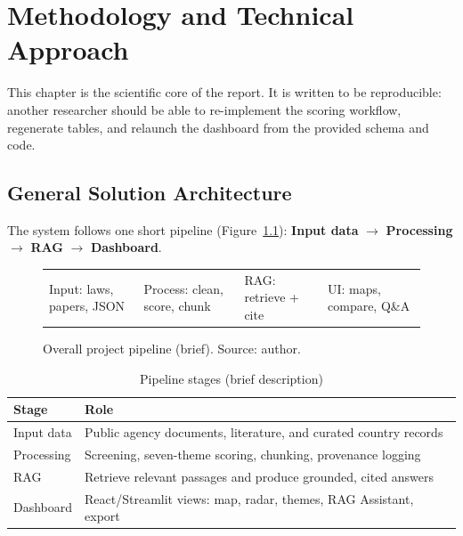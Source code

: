 \chapter{Methodology and Technical Approach}
\label{ch:method}

This chapter is the scientific core of the report. It is written to be reproducible: another researcher should be able to re-implement the scoring workflow, regenerate tables, and relaunch the dashboard from the provided schema and code.

\section{General Solution Architecture}
\label{sec:arch}

The system follows one short pipeline (Figure~\ref{fig:pipeline}):
\textbf{Input data} $\rightarrow$ \textbf{Processing} $\rightarrow$ \textbf{RAG}
$\rightarrow$ \textbf{Dashboard}.

\begin{figure}[htbp]
\centering
{}

\vspace{0.35em}
{\footnotesize
\begin{tabular}{@{}llll@{}}
Input: laws, papers, JSON &
Process: clean, score, chunk &
RAG: retrieve + cite &
UI: maps, compare, Q\&A \\
\end{tabular}}
\caption{Overall project pipeline (brief). Source: author.}
\label{fig:pipeline}
\end{figure}

\begin{table}[htbp]
\centering
\caption{Pipeline stages (brief description)}
\label{tab:arch}
\begin{tabular}{@{}p{2.6cm}p{9.0cm}@{}}
\toprule
\textbf{Stage} & \textbf{Role} \\
\midrule
Input data & Public agency documents, literature, and curated country records \\
Processing & Screening, seven-theme scoring, chunking, provenance logging \\
RAG & Retrieve relevant passages and produce grounded, cited answers \\
Dashboard & React/Streamlit views: map, radar, themes, RAG Assistant, export \\
\bottomrule
\end{tabular}
\end{table}

